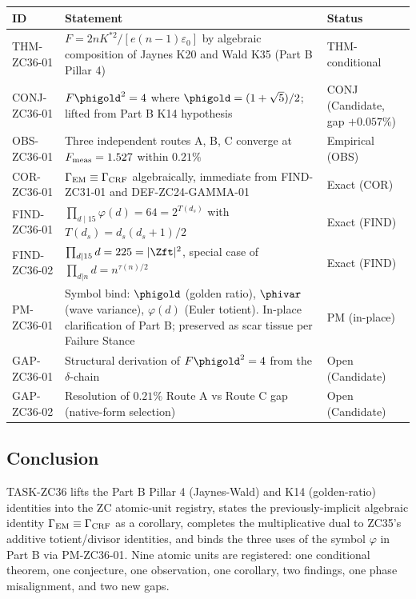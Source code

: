 \documentclass[12pt, a4paper]{article}
\begin{document}
\begin{longtable}{p{2.6cm} p{8.5cm} p{2.5cm}}
\toprule
\textbf{ID} & \textbf{Statement} & \textbf{Status}\\
\midrule
THM-ZC36-01 & $F = 2nK^{*2}/[e(n-1)\varepsilon_0]$
  by algebraic composition of Jaynes K20 and Wald K35
  (Part B Pillar 4) & THM-conditional\\
\midrule
CONJ-ZC36-01 & $F\phigold^2 = 4$ where
  $\phigold = (1+\sqrt 5)/2$; lifted from Part B K14
  hypothesis & CONJ (Candidate, gap $+0.057\%$)\\
\midrule
OBS-ZC36-01 & Three independent routes A, B, C converge at
  $F_{\rm meas} = 1.527$ within $0.21\%$ & Empirical (OBS)\\
\midrule
COR-ZC36-01 & $\Gamma_{\rm EM} \equiv \Gamma_{\rm CRF}$
  algebraically, immediate from FIND-ZC31-01 and
  DEF-ZC24-GAMMA-01 & Exact (COR)\\
\midrule
FIND-ZC36-01 & $\prod_{d \mid 15} \varphi(d) = 64 = 2^{T(d_s)}$
  with $T(d_s) = d_s(d_s+1)/2$ & Exact (FIND)\\
\midrule
FIND-ZC36-02 & $\prod_{d \mid 15} d = 225 = |\Zft|^2$,
  special case of $\prod_{d|n} d = n^{\tau(n)/2}$ & Exact (FIND)\\
\midrule
PM-ZC36-01 & Symbol bind: $\phigold$ (golden ratio),
  $\phivar$ (wave variance), $\varphi(d)$ (Euler totient).
  In-place clarification of Part B; preserved as scar tissue
  per Failure Stance & PM (in-place)\\
\midrule
GAP-ZC36-01 & Structural derivation of $F\phigold^2 = 4$ from
  the $\delta$-chain & Open (Candidate)\\
\midrule
GAP-ZC36-02 & Resolution of $0.21\%$ Route A vs Route C gap
  (native-form selection) & Open (Candidate)\\
\bottomrule
\end{longtable}

\subsection{Conclusion}
\label{sec:conclusion}

TASK-ZC36 lifts the Part B Pillar 4 (Jaynes-Wald) and K14
(golden-ratio) identities into the ZC atomic-unit registry,
states the previously-implicit algebraic identity
$\Gamma_{\rm EM} \equiv \Gamma_{\rm CRF}$ as a corollary,
completes the multiplicative dual to ZC35's additive
totient/divisor identities, and binds the three uses of the
symbol $\varphi$ in Part B via PM-ZC36-01. Nine atomic units
are registered: one conditional theorem, one conjecture, one
observation, one corollary, two findings, one phase
misalignment, and two new gaps.
\end{document}

